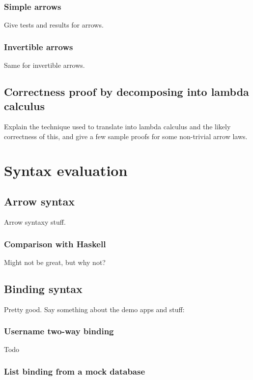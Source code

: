 \documentclass[12pt,twoside,notitlepage]{report}
\begin{document}
\subsubsection{Simple arrows}

Give tests and results for arrows.

\subsubsection{Invertible arrows}

Same for invertible arrows.

\subsection{Correctness proof by decomposing into lambda calculus}

Explain the technique used to translate into lambda calculus and the likely correctness of this, and give a few sample proofs for some non-trivial arrow laws.

\section{Syntax evaluation}

\subsection{Arrow syntax}

Arrow syntaxy stuff.

\subsubsection{Comparison with Haskell}

Might not be great, but why not?

\subsection{Binding syntax}

Pretty good. Say something about the demo apps and stuff:

\subsubsection{Username two-way binding}

Todo

\subsubsection{List binding from a mock database}
\end{document}
